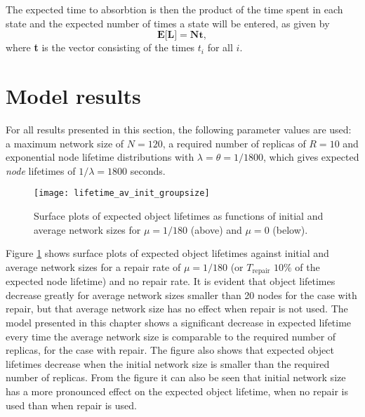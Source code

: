 The expected time to absorbtion is then the product of the time spent in each state and the expected number of times a state will be entered, as given by
%
\begin{equation} \label{expected_lifetime}
    \textbf{E[L]} = \textbf{Nt},
\end{equation}
%
where \textbf{t} is the vector consisting of the times $t_i$ for all $i$.

\section{Model results}
\label{results}

For all results presented in this section, the following parameter values are used: a maximum network size of $N=120$, a required number of replicas of $R = 10$ and exponential node lifetime distributions with $\lambda = \theta = 1/1800$, which gives expected \emph{node} lifetimes of $1/\lambda = 1800$ seconds.


\begin{figure}[htbp]
 \centering
 \texttt{[image: lifetime\_av\_init\_groupsize]}
 \caption{Surface plots of expected object lifetimes as functions of initial and average network sizes for $\mu = 1/180$ (above) and $\mu = 0$ (below).}
 \label{fig_lifetime_average_vs_initial}
\end{figure}
%
Figure \ref{fig_lifetime_average_vs_initial} shows surface plots of expected object lifetimes against initial and average network sizes for a repair rate of $\mu = 1/180$ (or $T_{\textrm{repair}}$ $10\%$ of the expected node lifetime) and no repair rate. It is evident that object lifetimes decrease greatly for average network sizes smaller than 20 nodes for the case with repair, but that average network size has no effect when repair is not used. The model presented in this chapter shows a significant decrease in expected lifetime every time the average network size is comparable to the required number of replicas, for the case with repair. The figure also shows that expected object lifetimes decrease when the initial network size is smaller than the required number of replicas. From the figure it can also be seen that initial network size has a more pronounced effect on the expected object lifetime, when no repair is used than when repair is used.

